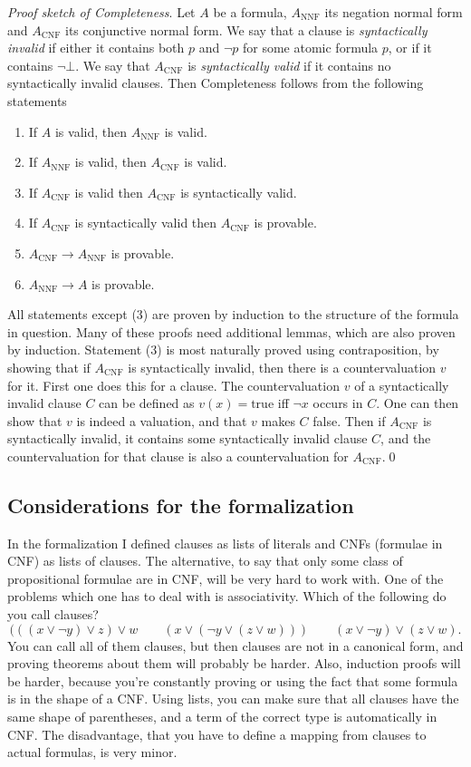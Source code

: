 \documentclass{article}
\newcommand{\cnf}{_{\text{CNF}}}
\newcommand{\nnf}{_{\text{NNF}}}
\begin{document}
\emph{Proof sketch of Completeness}. Let $A$ be a formula, $A\nnf$ its negation normal form and $A\cnf$ its conjunctive normal form. We say that a clause is \emph{syntactically invalid} if either it contains both $p$ and $\neg p$ for some atomic formula $p$, or if it contains $\neg\bot$. We say that $A\cnf$ is \emph{syntactically valid} if it contains no syntactically invalid clauses.
Then Completeness follows from the following statements
\begin{enumerate}[(1)]
\item If $A$ is valid, then $A\nnf$ is valid.
\item If $A\nnf$ is valid, then $A\cnf$ is valid.
\item If $A\cnf$ is valid then $A\cnf$ is syntactically valid.
\item If $A\cnf$ is syntactically valid then $A\cnf$ is provable.
\item $A\cnf\to A\nnf$ is provable.
\item $A\nnf\to A$ is provable.
\end{enumerate}
All statements except (3) are proven by induction to the structure of the formula in question. Many of these proofs need additional lemmas, which are also proven by induction. Statement (3) is most naturally proved using contraposition, by showing that if $A\cnf$ is syntactically invalid, then there is a countervaluation $v$ for it. First one does this for a clause. The countervaluation $v$ of a syntactically invalid clause $C$ can be defined as $v(x)=\text{true}$ iff $\neg x$ occurs in $C$. One can then show that $v$ is indeed a valuation, and that $v$ makes $C$ false. Then if $A\cnf$ is syntactically invalid, it contains some syntactically invalid clause $C$, and the countervaluation for that clause is also a countervaluation for $A\cnf$.\qed\\

\subsection{Considerations for the formalization}\label{sec_complete_considerations}
In the formalization I defined clauses as lists of literals and CNFs (formulae in CNF) as lists of clauses. The alternative, to say that only some class of propositional formulae are in CNF, will be very hard to work with. One of the problems which one has to deal with is associativity. Which of the following do you call clauses?
$$(((x\vee\neg y)\vee z)\vee w\qquad (x\vee(\neg y\vee (z\vee w)))\qquad (x\vee\neg y)\vee (z\vee w).$$
You can call all of them clauses, but then clauses are not in a canonical form, and proving theorems about them will probably be harder. Also, induction proofs will be harder, because you're constantly proving or using the fact that some formula is in the shape of a CNF. Using lists, you can make sure that all clauses have the same shape of parentheses, and a term of the correct type is automatically in CNF. The disadvantage, that you have to define a mapping from clauses to actual formulas, is very minor.
\end{document}
